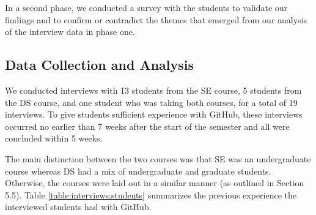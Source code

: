 
In a second phase, we conducted a survey with the students to validate our findings and to confirm or contradict the themes that emerged from our analysis of the interview data in phase one. 

\subsection{Data Collection and Analysis}
We conducted interviews with 13 students from the SE course, 5 students from the DS course, and one student who was taking both courses, for a total of 19 interviews.
To give students sufficient experience with GitHub, these interviews occurred no earlier than 7 weeks after the start of the semester and all were concluded within 5 weeks.

 The main distinction between the two courses was that SE was an undergraduate course whereas DS had a mix of undergraduate and graduate students. Otherwise, the courses were laid out in a similar manner (as outlined in Section 5.5). Table \ref{table:interviews:students} summarizes the previous experience the interviewed students had with GitHub.

